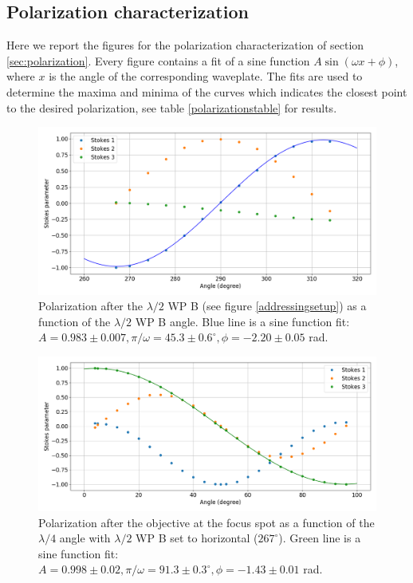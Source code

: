 \documentclass[english, a4paper, 12pt, twoside]{book}
\numberwithin{equation}{section} %
\begin{document}
\begin{appendices}

\chapter{Polarization characterization}
\label{app:polarization}
Here we report the figures for the polarization characterization of section \ref{sec:polarization}. Every figure contains a fit of a sine function $A\sin(\omega x +\phi)$, where $x$ is the angle of the corresponding waveplate. The fits are used to determine the maxima and minima of the curves which indicates the closest point to the desired polarization, see table \ref{polarizationstable} for results.
\begin{figure}[H]
\centering
\includegraphics[width = \textwidth]{pol3}
\caption{Polarization after the $\lambda/2$ WP B (see figure \ref{addressingsetup}) as a function of the $\lambda/2$ WP B angle. Blue line is a sine function fit: $A = 0.983 \pm 0.007, \pi/\omega = 45.3 \pm 0.6^\circ, \phi = -2.20\pm0.05$ rad.}
\label{pol1}
\end{figure}
\begin{figure}[H]
\centering
\includegraphics[width = \textwidth]{pol1}
\caption{Polarization after the objective at the focus spot as a function of the $\lambda/4$ angle with $\lambda/2$ WP B set to horizontal ($267^\circ$). Green line is a sine function fit: $A = 0.998\pm 0.02, \pi/\omega = 91.3\pm0.3^\circ, \phi = -1.43\pm0.01$ rad.}

\end{figure}
\end{appendices}
\end{document}
